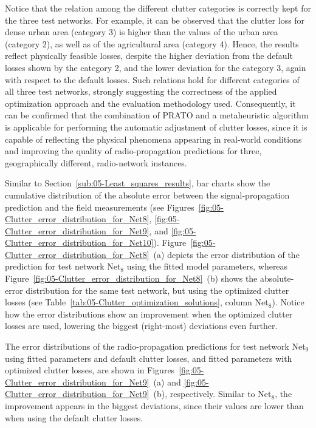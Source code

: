 Notice that the relation among the different clutter categories is
correctly kept for the three test networks. For example, it can be
observed that the clutter loss for dense urban area (category 3) is
higher than the values of the urban area (category 2), as well as
of the agricultural area (category 4). Hence, the results reflect
physically feasible losses, despite the higher deviation from the
default losses shown by the category 2, and the lower deviation for
the category 3, again with respect to the default losses. Such relations
hold for different categories of all three test networks, strongly
suggesting the correctness of the applied optimization approach and
the evaluation methodology used. Consequently, it can be confirmed
that the combination of PRATO and a metaheuristic algorithm is applicable
for performing the automatic adjustment of clutter losses, since it
is capable of reflecting the physical phenomena appearing in real-world
conditions and improving the quality of radio-propagation predictions
for three, geographically different, radio-network instances.

\bigskip{}


Similar to Section~\ref{sub:05-Least_squares_results}, bar charts
show the cumulative distribution of the absolute error between the
signal-propagation prediction and the field measurements (see Figures~\ref{fig:05-Clutter_error_distribution_for_Net8},
\ref{fig:05-Clutter_error_distribution_for_Net9}, and \ref{fig:05-Clutter_error_distribution_for_Net10}).
Figure~\ref{fig:05-Clutter_error_distribution_for_Net8}~(a) depicts
the error distribution of the prediction for test network Net$_{8}$
using the fitted model parameters, whereas Figure~\ref{fig:05-Clutter_error_distribution_for_Net8}~(b)
shows the absolute-error distribution for the same test network, but
using the optimized clutter losses (see Table~\ref{tab:05-Clutter_optimization_solutions},
column Net$_{8}$). Notice how the error distributions show an improvement
when the optimized clutter losses are used, lowering the biggest (right-most)
deviations even further.

The error distributions of the radio-propagation predictions for test
network Net$_{9}$ using fitted parameters and default clutter losses,
and fitted parameters with optimized clutter losses, are shown in
Figures~\ref{fig:05-Clutter_error_distribution_for_Net9}~(a) and
\ref{fig:05-Clutter_error_distribution_for_Net9}~(b), respectively.
Similar to Net$_{8}$, the improvement appears in the biggest deviations,
since their values are lower than when using the default clutter losses.

